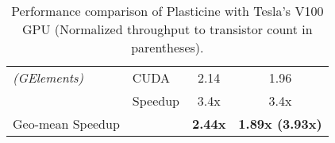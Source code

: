 \begin{table}[t]
\begin{tabular}{llcc}
        {\em (GElements)}      & CUDA                & 2.14           & 1.96                 \\
                               & Speedup             & 3.4x           & 3.4x                 \\
      \midrule
      Geo-mean Speedup         &                     & \textbf{2.44x} & \textbf{1.89x (3.93x)} \\
      \bottomrule
    \end{tabular}
  \caption{Performance comparison of Plasticine with Tesla's V100 GPU (Normalized throughput to transistor count in parentheses).}
  \label{tab:gpu-comparison}
\end{table}
  
  
